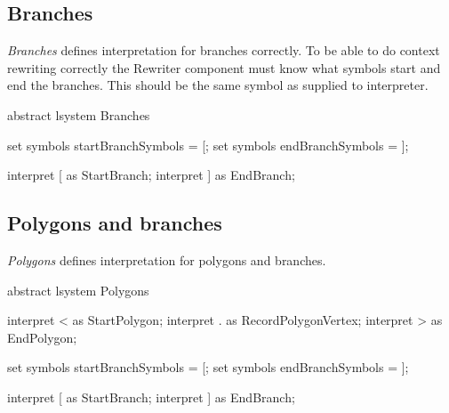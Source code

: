 

\subsection{Branches}

\lsystem \emph{Branches} defines interpretation for branches correctly.
To be able to do context rewriting correctly the Rewriter component must know what symbols start and end the branches.
This should be the same symbol as supplied to interpreter.

\begin{LsystemBreak}
abstract lsystem Branches {
	set symbols startBranchSymbols = [;
	set symbols endBranchSymbols = ];

	interpret [ as StartBranch;
	interpret ] as EndBranch;
}
\end{LsystemBreak}


\subsection{Polygons and branches}

\lsystem \emph{Polygons} defines interpretation for polygons and branches.

\begin{LsystemBreak}
abstract lsystem Polygons {
	interpret < as StartPolygon;
	interpret . as RecordPolygonVertex;
	interpret > as EndPolygon;

	set symbols startBranchSymbols = [;
	set symbols endBranchSymbols = ];

	interpret [ as StartBranch;
	interpret ] as EndBranch;
}
\end{LsystemBreak}



